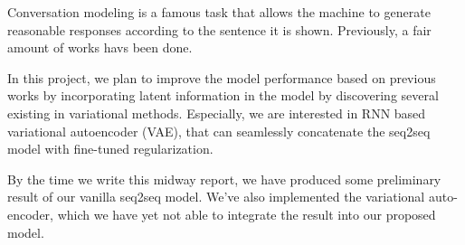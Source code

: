Conversation modeling is a famous task that allows the machine to generate reasonable responses according to the sentence it is shown. Previously, a fair amount of works havs been done.

In this project, we plan to improve the model performance based on previous works by incorporating latent information in the model by discovering several existing in variational methods. Especially, we are interested in RNN based variational autoencoder (VAE), that can seamlessly concatenate the seq2seq model with fine-tuned regularization.

By the time we write this midway report, we have produced some preliminary result of our vanilla seq2seq model. We've also implemented the variational auto-encoder, which we have yet not able to integrate the result into our proposed model.